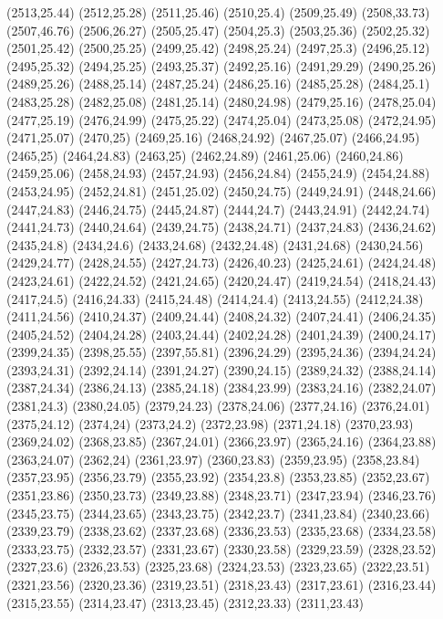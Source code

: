 (2513,25.44)
(2512,25.28)
(2511,25.46)
(2510,25.4)
(2509,25.49)
(2508,33.73)
(2507,46.76)
(2506,26.27)
(2505,25.47)
(2504,25.3)
(2503,25.36)
(2502,25.32)
(2501,25.42)
(2500,25.25)
(2499,25.42)
(2498,25.24)
(2497,25.3)
(2496,25.12)
(2495,25.32)
(2494,25.25)
(2493,25.37)
(2492,25.16)
(2491,29.29)
(2490,25.26)
(2489,25.26)
(2488,25.14)
(2487,25.24)
(2486,25.16)
(2485,25.28)
(2484,25.1)
(2483,25.28)
(2482,25.08)
(2481,25.14)
(2480,24.98)
(2479,25.16)
(2478,25.04)
(2477,25.19)
(2476,24.99)
(2475,25.22)
(2474,25.04)
(2473,25.08)
(2472,24.95)
(2471,25.07)
(2470,25)
(2469,25.16)
(2468,24.92)
(2467,25.07)
(2466,24.95)
(2465,25)
(2464,24.83)
(2463,25)
(2462,24.89)
(2461,25.06)
(2460,24.86)
(2459,25.06)
(2458,24.93)
(2457,24.93)
(2456,24.84)
(2455,24.9)
(2454,24.88)
(2453,24.95)
(2452,24.81)
(2451,25.02)
(2450,24.75)
(2449,24.91)
(2448,24.66)
(2447,24.83)
(2446,24.75)
(2445,24.87)
(2444,24.7)
(2443,24.91)
(2442,24.74)
(2441,24.73)
(2440,24.64)
(2439,24.75)
(2438,24.71)
(2437,24.83)
(2436,24.62)
(2435,24.8)
(2434,24.6)
(2433,24.68)
(2432,24.48)
(2431,24.68)
(2430,24.56)
(2429,24.77)
(2428,24.55)
(2427,24.73)
(2426,40.23)
(2425,24.61)
(2424,24.48)
(2423,24.61)
(2422,24.52)
(2421,24.65)
(2420,24.47)
(2419,24.54)
(2418,24.43)
(2417,24.5)
(2416,24.33)
(2415,24.48)
(2414,24.4)
(2413,24.55)
(2412,24.38)
(2411,24.56)
(2410,24.37)
(2409,24.44)
(2408,24.32)
(2407,24.41)
(2406,24.35)
(2405,24.52)
(2404,24.28)
(2403,24.44)
(2402,24.28)
(2401,24.39)
(2400,24.17)
(2399,24.35)
(2398,25.55)
(2397,55.81)
(2396,24.29)
(2395,24.36)
(2394,24.24)
(2393,24.31)
(2392,24.14)
(2391,24.27)
(2390,24.15)
(2389,24.32)
(2388,24.14)
(2387,24.34)
(2386,24.13)
(2385,24.18)
(2384,23.99)
(2383,24.16)
(2382,24.07)
(2381,24.3)
(2380,24.05)
(2379,24.23)
(2378,24.06)
(2377,24.16)
(2376,24.01)
(2375,24.12)
(2374,24)
(2373,24.2)
(2372,23.98)
(2371,24.18)
(2370,23.93)
(2369,24.02)
(2368,23.85)
(2367,24.01)
(2366,23.97)
(2365,24.16)
(2364,23.88)
(2363,24.07)
(2362,24)
(2361,23.97)
(2360,23.83)
(2359,23.95)
(2358,23.84)
(2357,23.95)
(2356,23.79)
(2355,23.92)
(2354,23.8)
(2353,23.85)
(2352,23.67)
(2351,23.86)
(2350,23.73)
(2349,23.88)
(2348,23.71)
(2347,23.94)
(2346,23.76)
(2345,23.75)
(2344,23.65)
(2343,23.75)
(2342,23.7)
(2341,23.84)
(2340,23.66)
(2339,23.79)
(2338,23.62)
(2337,23.68)
(2336,23.53)
(2335,23.68)
(2334,23.58)
(2333,23.75)
(2332,23.57)
(2331,23.67)
(2330,23.58)
(2329,23.59)
(2328,23.52)
(2327,23.6)
(2326,23.53)
(2325,23.68)
(2324,23.53)
(2323,23.65)
(2322,23.51)
(2321,23.56)
(2320,23.36)
(2319,23.51)
(2318,23.43)
(2317,23.61)
(2316,23.44)
(2315,23.55)
(2314,23.47)
(2313,23.45)
(2312,23.33)
(2311,23.43)
